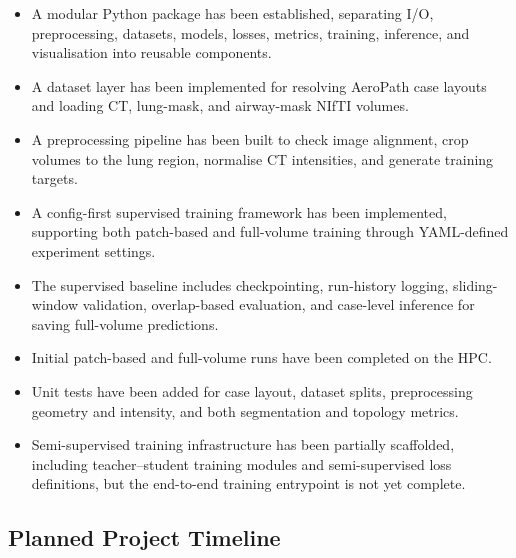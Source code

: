 \documentclass[11pt,a4paper]{article}
\begin{document}
\begin{itemize}
    \item A modular Python package has been established, separating I/O, preprocessing, datasets, models, losses, metrics, training, inference, and visualisation into reusable components.
    \item A dataset layer has been implemented for resolving AeroPath case layouts and loading CT, lung-mask, and airway-mask NIfTI volumes.
    \item A preprocessing pipeline has been built to check image alignment, crop volumes to the lung region, normalise CT intensities, and generate training targets.
    \item A config-first supervised training framework has been implemented, supporting both patch-based and full-volume training through YAML-defined experiment settings.
    \item The supervised baseline includes checkpointing, run-history logging, sliding-window validation, overlap-based evaluation, and case-level inference for saving full-volume predictions.
    \item Initial patch-based and full-volume runs have been completed on the HPC.
    \item Unit tests have been added for case layout, dataset splits, preprocessing geometry and intensity, and both segmentation and topology metrics.
    \item Semi-supervised training infrastructure has been partially scaffolded, including teacher--student training modules and semi-supervised loss definitions, but the end-to-end training entrypoint is not yet complete.
\end{itemize}

\subsection{Planned Project Timeline}

\end{document}
